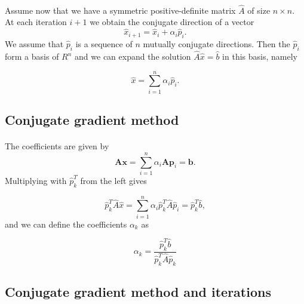 \documentclass[%
oneside,                 %
final,                   %
10pt]{article}
\begin{document}
\paragraph{}
Assume now that we have a symmetric positive-definite matrix $\hat{A}$ of size
$n\times n$. At each iteration $i+1$ we obtain the conjugate direction of a vector
\begin{equation*}
\hat{x}_{i+1}=\hat{x}_{i}+\alpha_i\hat{p}_{i}. 
\end{equation*}
We assume that $\hat{p}_{i}$ is a sequence of $n$ mutually conjugate directions. 
Then the $\hat{p}_{i}$  form a basis of $R^n$ and we can expand the solution 
$  \hat{A}\hat{x} = \hat{b}$ in this basis, namely

\begin{equation*}
  \hat{x}  = \sum^{n}_{i=1} \alpha_i \hat{p}_i.
\end{equation*}



\subsection*{Conjugate gradient method}

\paragraph{}
The coefficients are given by
\begin{equation*}
    \mathbf{A}\mathbf{x} = \sum^{n}_{i=1} \alpha_i \mathbf{A} \mathbf{p}_i = \mathbf{b}.
\end{equation*}
Multiplying with $\hat{p}_k^T$  from the left gives

\begin{equation*}
  \hat{p}_k^T \hat{A}\hat{x} = \sum^{n}_{i=1} \alpha_i\hat{p}_k^T \hat{A}\hat{p}_i= \hat{p}_k^T \hat{b},
\end{equation*}
and we can define the coefficients $\alpha_k$ as

\begin{equation*}
    \alpha_k = \frac{\hat{p}_k^T \hat{b}}{\hat{p}_k^T \hat{A} \hat{p}_k}
\end{equation*}



\subsection*{Conjugate gradient method and iterations}
\end{document}
